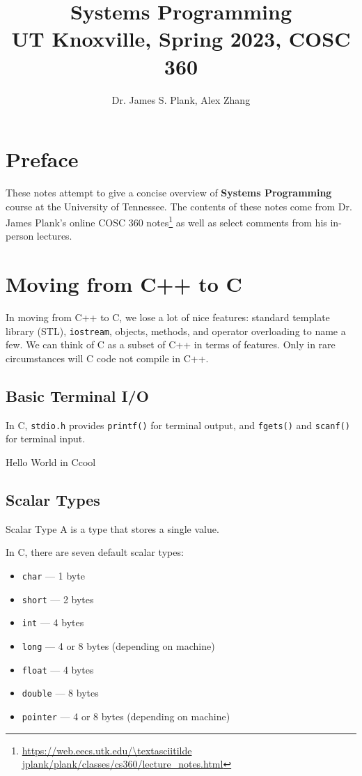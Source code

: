 \documentclass[12pt]{report}
\title{\textbf{Systems Programming}\\
\large UT Knoxville, Spring 2023, COSC 360}
\author{Dr. James S. Plank, Alex Zhang}
\begin{document}
\maketitle
\tableofcontents

\chapter*{Preface}
These notes attempt to give a concise overview of \textbf{Systems Programming} course at the University of Tennessee. The contents of these notes come from Dr. James Plank's online COSC 360 notes\footnote{\url{https://web.eecs.utk.edu/\textasciitilde jplank/plank/classes/cs360/lecture\_notes.html}} as well as select comments from his in-person lectures.

\chapter{Moving from C++ to C}
In moving from C++ to C, we lose a lot of nice features: standard template library (STL), \texttt{iostream}, objects, methods, and operator overloading to name a few. We can think of C as a subset of C++ in terms of features. Only in rare circumstances will C code not compile in C++.

\section{Basic Terminal I/O}
In C, \texttt{stdio.h} provides \texttt{printf()} for terminal output, and \texttt{fgets()} and \texttt{scanf()} for terminal input.

\begin{codebox}{Hello World in C}{cool}
\end{codebox}

\section{Scalar Types}

\begin{dfnbox}{Scalar Type}{}
    A  is a type that stores a single value.
\end{dfnbox}

In C, there are seven default scalar types:
\begin{itemize}
    \item \texttt{char} --- 1 byte
    \item \texttt{short} --- 2 bytes
    \item \texttt{int} --- 4 bytes
    \item \texttt{long} --- 4 or 8 bytes (depending on machine)
    \item \texttt{float} --- 4 bytes
    \item \texttt{double} --- 8 bytes
    \item \texttt{pointer} --- 4 or 8 bytes (depending on machine)
\end{itemize}
\end{document}
